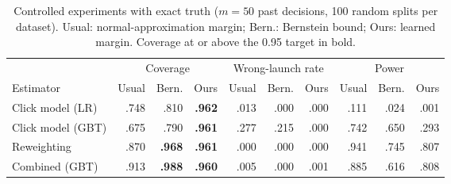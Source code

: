 \begin{table}[t]
\centering
\caption{Controlled experiments with exact truth ($m=50$ past decisions, 100 random splits per dataset). Usual: normal-approximation margin; Bern.: Bernstein bound; Ours: learned margin. Coverage at or above the 0.95 target in bold.}
\label{tab:semi}
\small
\begin{tabular}{lrrrrrrrrr}
\toprule
& \multicolumn{3}{c}{Coverage} & \multicolumn{3}{c}{Wrong-launch rate} & \multicolumn{3}{c}{Power} \\
Estimator & Usual & Bern. & Ours & Usual & Bern. & Ours & Usual & Bern. & Ours \\
\midrule
Click model (LR) & .748 & .810 & \textbf{.962} & .013 & .000 & .000 & .111 & .024 & .001 \\
Click model (GBT) & .675 & .790 & \textbf{.961} & .277 & .215 & .000 & .742 & .650 & .293 \\
Reweighting & .870 & \textbf{.968} & \textbf{.961} & .000 & .000 & .000 & .941 & .745 & .807 \\
Combined (GBT) & .913 & \textbf{.988} & \textbf{.960} & .005 & .000 & .001 & .885 & .616 & .808 \\
\bottomrule
\end{tabular}
\end{table}
